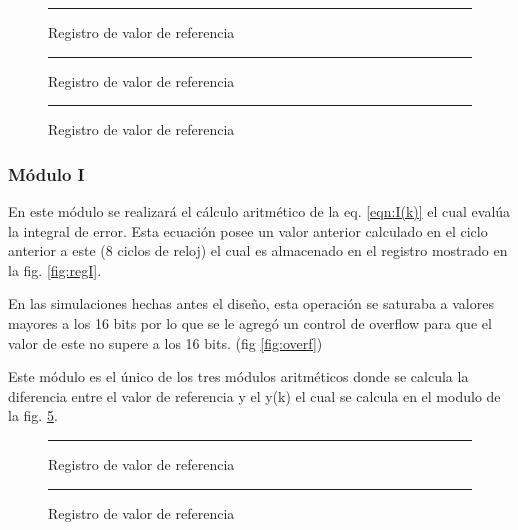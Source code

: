 \documentclass[12pt,a4paper]{article} %
\begin{document}
\begin{figure}[htbp]
  \centering
    \rule{35em}{0.3pt}
  \caption[cont8]{Registro de valor de referencia}
  \label{fig:cont8}
\end{figure}

\begin{figure}[htbp]
  \centering
    \rule{35em}{0.3pt}
  \caption[contn]{Registro de valor de referencia}
  \label{fig:contn}
\end{figure}

\begin{figure}[htbp]
  \centering
    \rule{35em}{0.3pt}
  \caption[estados]{Registro de valor de referencia}
  \label{fig:Estados}
\end{figure}

\subsubsection{Módulo I}

En este módulo se realizará el cálculo aritmético de la eq. \ref{eqn:I(k)} el cual evalúa la integral de error. Esta ecuación posee un valor anterior calculado en el ciclo anterior a este (8 ciclos de reloj) el cual es almacenado en el registro mostrado en la fig. \ref{fig:regI}.

En las simulaciones hechas antes el diseño, esta operación se saturaba a valores mayores a los 16 bits por lo que se le agregó un control de overflow para que el valor de este no supere a los 16 bits. (fig \ref{fig:overf})

Este módulo es el único de los tres módulos aritméticos donde se calcula la diferencia entre el valor de referencia y el y(k) el cual se calcula en el modulo de la fig. \ref{fig:error}.
 
\begin{figure}[htbp]
  \centering
    \rule{35em}{0.3pt}
  \caption[I]{Registro de valor de referencia}
  \label{fig:I}
\end{figure}

\begin{figure}[htbp]
  \centering
    \rule{35em}{0.3pt}
  \caption[error]{Registro de valor de referencia}
  \label{fig:error}
\end{figure}
\end{document}
